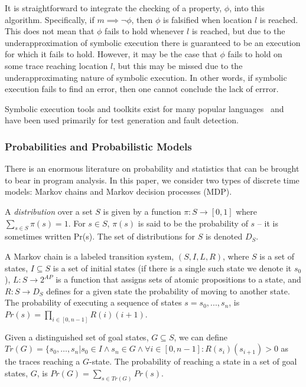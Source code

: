 It is straightforward to integrate the checking of a property,
$\phi$, into this algorithm.  Specifically,
if $m \implies \neg\phi$, then $\phi$ is falsified 
when location $l$ is reached.    This does not mean that $\phi$
fails to hold whenever $l$ is reached, but due to the underapproximation
of symbolic execution there is guaranteed to be an execution for which
it fails to hold.
However, it may be the case that $\phi$ fails to hold
on some trace reaching location $l$, but this may be missed
due to the underapproximating nature of symbolic execution.
In other words, if symbolic execution fails to find an error,
then one cannot conclude the lack of errror.

Symbolic execution tools and toolkits exist for many popular 
languages~\cite{pasareanu2010symbolic,godefroid2005dart,jamrozik2013generating,cadar2008klee}
and have been used primarily for test generation and fault detection.

\subsubsection{Probabilities and Probabilistic Models}

There is an enormous literature on probability and statistics
that can be brought to bear in program analysis.  
In this paper, we consider two types of discrete time models:
Markov chains and Markov decision processes (MDP).

A \textit{distribution} over a set $S$ is given by a 
function $\pi : S \rightarrow [0,1]$ where
$\sum_{s \in S} \pi(s) = 1$.  For $s \in S$,
$\pi(s)$ is said to be the probability of $s$ -- it is
sometimes written Pr(s).
The set of distributions for $S$ is denoted $D_S$.

A Markov chain is a labeled transition system,
$(S,I,L,R)$, where $S$ is a set of states,
$I \subseteq S$ is a set of initial states (if there is a single
such state we denote it $s_0$), 
$L : S \rightarrow 2^{AP}$ is a function that assigns
sets of atomic propositions to a state, and
$R : S \rightarrow D_S$ defines for a given state
the probability of moving to another state.
The probability of executing a sequence of states $s = s_0, ..., s_n$, 
is $Pr(s) = \prod_{i \in [0,n-1]} R(i)(i+1)$.

Given a distinguished set of goal states, $G \subseteq S$,
we can define $Tr(G) = \{s_0, \ldots, s_n \vert s_0 \in I \wedge
s_n \in G \wedge \forall i \in [0,n-1] : R(s_i)(s_{i+1}) > 0$
as the traces reaching a $G$-state.
The probability of reaching a state in 
a set of goal states, $G$, is $Pr(G) = \sum_{s \in Tr(G)} Pr(s)$.

